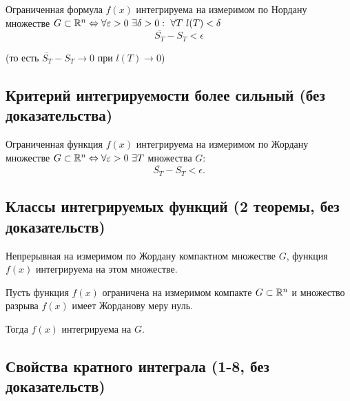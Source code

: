\begin{theorem}
    Ограниченная формула $ f(x) $ интегрируема на измеримом по Нордану множестве $ G \subset \R^n \iff \forall \epsilon > 0 \ \exists\delta > 0: \ \forall T \ l(T)<\delta$
    \[
        \overline{S_T} - S_T < \epsilon
    \]
    \begin{center}
        (то есть $ \overline{S_T} - S_T \rightarrow 0 $ при $ l(T) \rightarrow 0 $)
    \end{center}
\end{theorem}

\subsection{Критерий интегрируемости более сильный (без доказательства)}

\begin{theorem}
    Ограниченная функция $ f(x) $ интегрируема на измеримом по Жордану множестве $ G \subset \R^n \iff \forall \epsilon > 0 \ \exists T $ множества $ G $:
    \[
        \overline{S_T} - S_T < \epsilon.
    \]
\end{theorem}

\subsection{Классы интегрируемых функций (2 теоремы, без доказательств)}

\begin{theorem}
    Непрерывная на измеримом по Жордану компактном множестве $ G $, функция $ f(x) $ интегрируема на этом множестве.
\end{theorem}

\begin{theorem}
    Пусть функция $ f(x) $ ограничена на измеримом компакте $ G \subset \mathbb{R}^n $ и множество разрыва $ f(x) $ имеет Жорданову меру нуль.

    Тогда $ f(x) $ интегрируема на $ G $.
\end{theorem}

\subsection{Свойства кратного интеграла (1-8, без доказательств)}

